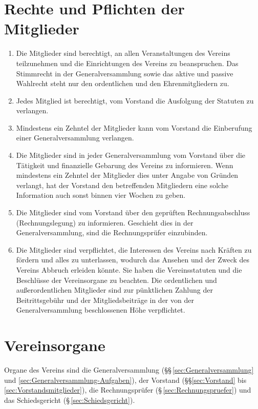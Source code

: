 \documentclass[a4paper,12pt]{article}
\begin{document}
\section{Rechte und Pflichten der Mitglieder} %
\label{sec:Rechte-Pflichten}
\begin{enumerate}

\item\label{item:rp-rechte} Die Mitglieder sind berechtigt, an allen Veranstaltungen des Vereins teilzunehmen und die Einrichtungen des Vereins zu beanspruchen. Das Stimmrecht in der Generalversammlung sowie das aktive und passive Wahlrecht steht nur den ordentlichen und den Ehrenmitgliedern zu.
\item Jedes Mitglied ist berechtigt, vom Vorstand die Ausfolgung der Statuten zu verlangen.
\item Mindestens ein Zehntel der Mitglieder kann vom Vorstand die Einberufung einer Generalversammlung verlangen.
\item Die Mitglieder sind in jeder Generalversammlung vom Vorstand über die Tätigkeit und finanzielle Gebarung des Vereins zu informieren. Wenn mindestens ein Zehntel der Mitglieder dies unter Angabe von Gründen verlangt, hat der Vorstand den betreffenden Mitgliedern eine solche Information auch sonst binnen vier Wochen zu geben.
\item Die Mitglieder sind vom Vorstand über den geprüften Rechnungsabschluss (Rechnungslegung) zu informieren. Geschieht dies in der Generalversammlung, sind die Rechnungsprüfer einzubinden.

\item\label{item:rp-pflichten} Die Mitglieder sind verpflichtet, die Interessen des Vereins nach Kräften zu fördern und alles zu unterlassen, wodurch das Ansehen und der Zweck des Vereins Abbruch erleiden könnte. Sie haben die Vereinsstatuten und die Beschlüsse der Vereinsorgane zu beachten. Die ordentlichen und außerordentlichen Mitglieder sind zur pünktlichen Zahlung der Beitrittsgebühr und der Mitgliedsbeiträge in der von der Generalversammlung beschlossenen Höhe verpflichtet.
\end{enumerate}


\section{Vereinsorgane} %
\label{sec:Vereinsorgane}
Organe des Vereins sind die Generalversammlung
(§§\,\ref{sec:Generalversammlung} und
\ref{sec:Generalversammlung-Aufgaben}), der Vorstand
(§§\ref{sec:Vorstand} bis \ref{sec:Vorstandsmitglieder}), die
Rechnungsprüfer (§\,\ref{sec:Rechnungspruefer}) und das Schiedsgericht
(§\,\ref{sec:Schiedsgericht}).
\end{document}
